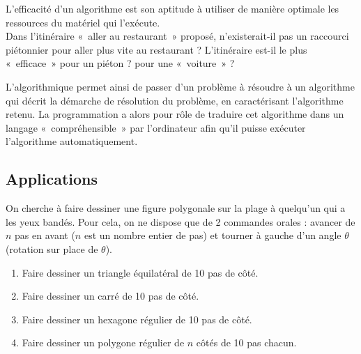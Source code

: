 \begin{question} 
L'efficacité d'un algorithme est son aptitude à utiliser de manière optimale
les ressources du matériel qui l'exécute.\\
Dans l'itinéraire «~aller au restaurant~» proposé, n'existerait-il pas un raccourci 
piétonnier pour aller plus vite au restaurant ?
L'itinéraire est-il le plus «~efficace~» pour un piéton ? pour une «~voiture~» ?
\end{question}

L'algorithmique permet ainsi de passer d'un problème à résoudre à un algorithme
qui décrit la démarche de résolution du problème, en caractérisant l'algorithme retenu. 
La programmation a alors pour rôle de traduire cet
algorithme dans un langage «~compréhensible~» par l'ordinateur afin qu'il
puisse exécuter l'algorithme automatiquement.

\subsection{Applications}
\begin{question}
On cherche à faire dessiner une figure polygonale
sur la plage à quelqu'un qui a les yeux bandés.
Pour cela, on ne dispose que de 2 commandes orales :
avancer de $n$ pas en avant ($n$ est un nombre entier de pas) et 
tourner à gauche d'un angle $\theta$ (rotation sur place de $\theta$).
\begin{enumerate}
\item Faire dessiner un triangle équilatéral de 10 pas de côté.
\item Faire dessiner un carré de 10 pas de côté.
\item Faire dessiner un hexagone régulier de 10 pas de côté.
\item Faire dessiner un polygone régulier de $n$ côtés de 10 pas chacun.
\end{enumerate}
\end{question}

